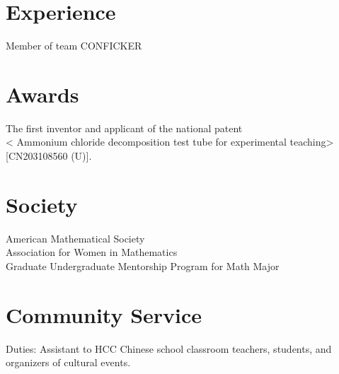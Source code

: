 \documentclass[]{deedy-resume-openfont}
\begin{document}
\begin{minipage}[t]{0.66\textwidth}
\section{Experience}

\vspace{\topsep} %
\begin{tightemize}
\item Member of team CONFICKER
\end{tightemize}
\sectionsep




\section{Awards} 



 The first inventor and applicant of the national patent  \\ < Ammonium chloride decomposition test tube for experimental teaching> [CN203108560 (U)].   

\sectionsep


\section{Society}  
American Mathematical Society \\

Association for Women in Mathematics \\

Graduate Undergraduate Mentorship Program for Math Major \\

\sectionsep

\section{Community Service} 

Duties: Assistant to HCC Chinese school classroom teachers, students, and organizers of cultural events.\\

\sectionsep

\end{minipage} 
\end{document}
